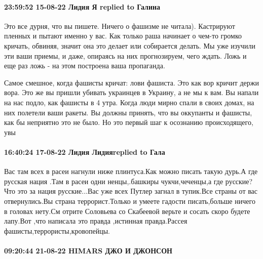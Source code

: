  
 
 
 
 

\paragraph{23:59:52 15-08-22 Лидия Я replied to Галина}

Это все дурня, что вы пишете. Ничего о фашизме не читала). Кастрируют пленных и
пытают именно у вас. Как только раша начинает о чем-то громко кричать, обвиняя,
значит она это делает или собирается делать. Мы уже изучили эти ваши приемы, и
даже, опираясь на них прогнозируем, чего ждать. Ложь и еще раз ложь - на этом
построена ваша пропаганда.

Самое смешное, когда фашисты кричат: лови фашиста. Это как вор кричит держи
вора. Это же вы пришли убивать украинцев в Украину, а не мы к вам. Вы напали на
нас подло, как фашисты в 4 утра. Когда люди мирно спали в своих домах, на них
полетели ваши ракеты. Вы должны принять, что вы оккупанты и фашисты, как бы
неприятно это не было. Но это первый шаг к осознанию происходящего, увы

\paragraph{16:40:24 17-08-22 Лидия Лидияreplied to Гала}

Вас там всех в расеи нагнули ниже плинтуса.Как можно писать такую дурь.А где
русская нация .Там в расеи одни ненцы,.башкиры чукчи,чеченцы,а где русские?Что
это за нация русские...Вас уже всех Путлер загнал в тупик.Все страны от вас
отвернулись.Вы страна террорист.Только и умеете гадости писать,больше ничего в
головах нету.См отрите Соловьева со Скабеевой верьте и сосать скоро будете
лапу.Вот ,что написала это правда ,истинная правда.Рассея
фашисты,террористы,кровопейцы.

\paragraph{09:20:44 21-08-22 HIMARS ДЖО И ДЖОНСОН}

